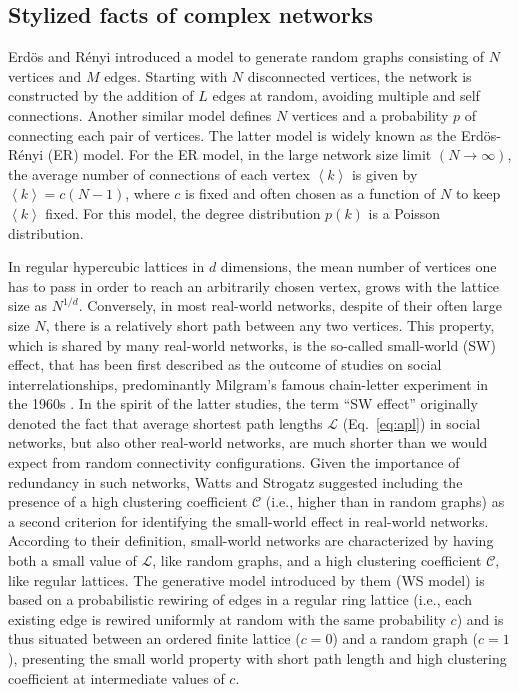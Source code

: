 	\subsection{Stylized facts of complex networks} \label{sec:styleFacts}
	Erd\"os and R\'enyi \cite{Erdos1959} introduced a model to generate random graphs consisting of $N$ vertices and $M$ edges. Starting with $N$ disconnected vertices, the network is constructed by the addition of $L$ edges at random, avoiding multiple and self connections. Another similar model defines $N$ vertices and a probability $p$ of connecting each pair of vertices. The latter model is widely known as the Erd\"os-R\'enyi (ER) model. For the ER model, in the large network size limit $(N \to \infty)$, the average number of connections of each vertex $\left < k \right>$ is given by $\left< k \right > = c (N - 1)$, where $c$ is fixed and often chosen as a function of $N$ to keep $\left < k \right >$ fixed. For this model, the degree distribution $p(k)$ is a Poisson distribution. 
	
	In regular hypercubic lattices in $d$ dimensions, the mean number of vertices one has to pass in order to reach an arbitrarily chosen vertex, grows with the lattice size as $N^{1/d}$. Conversely, in most real-world networks, despite of their often large size $N$, there is a relatively short path between any two vertices. This property, which is shared by many real-world networks, is the so-called small-world (SW) effect, that has been first described as the outcome of studies on social interrelationships, predominantly Milgram's famous chain-letter experiment in the 1960s \cite{Milgram1967}. In the spirit of the latter studies, the term ``SW effect'' originally denoted the fact that average shortest path lengths $\mathcal{L}$ (Eq.~\ref{eq:apl}) in social networks, but also other real-world networks, are much shorter than we would expect from random connectivity configurations. Given the importance of redundancy in such networks, Watts and Strogatz \cite{Watts1998} suggested including the presence of a high clustering coefficient $\mathcal{C}$ (i.e., higher than in random graphs) as a second criterion for identifying the small-world effect in real-world networks. According to their definition, small-world networks are characterized by having both a small value of $\mathcal{L}$, like random graphs, and a high clustering coefficient $\mathcal{C}$, like regular lattices. The generative model introduced by them (WS model) is based on a probabilistic rewiring of edges in a regular ring lattice (i.e., each existing edge is rewired uniformly at random with the same probability $c$) and is thus situated between an ordered finite lattice ($c=0$) and a random graph ($c=1$), presenting the small world property with short path length and high clustering coefficient at intermediate values of $c$. 

